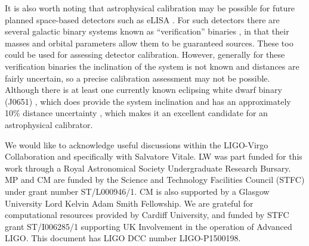 \documentclass[prd, twocolumn, lengthcheck, superscriptaddress, showpacs, letterpaper, nofootinbib]{revtex4-1}
\newcommand{\dcc}{LIGO-P1500198}
\begin{document}
It is also worth noting that astrophysical calibration may be possible for future planned 
space-based detectors such as eLISA \cite{2013GWN.....6....4A}. For such detectors there are 
several 
galactic binary systems known as ``verification'' binaries \cite{2006CQGra..23S.809S}, in that 
their masses and orbital parameters allow them to be guaranteed sources. These too could be used 
for assessing detector calibration. However, generally for these verification binaries 
the inclination of the system is not known and distances are fairly uncertain, so a precise 
calibration assessment may not be possible. Although there is at least one currently known 
eclipsing white dwarf binary (J0651) \cite{2041-8205-737-1-L23}, which does provide the system 
inclination \cite{2012ApJ...757L..21H, 2013ASPC..467...47K} and has an approximately 10\% distance 
uncertainty \cite{2041-8205-737-1-L23}, which makes it an excellent candidate for an astrophysical 
calibrator.

\acknowledgements

We would like to acknowledge useful discussions within the LIGO-Virgo
Collaboration and specifically with Salvatore Vitale. LW was part funded for
this work through a Royal Astronomical Society Undergraduate Research Bursary.
MP and CM are funded by the Science and Technology Facilities Council (STFC) under grant
number ST/L000946/1. CM is also supported by a Glasgow University Lord Kelvin
Adam Smith Fellowship. We are grateful for computational resources provided by
Cardiff University, and funded by STFC grant ST/I006285/1 supporting UK Involvement in
the operation of Advanced LIGO. This document has LIGO DCC number \dcc.


\end{document}
